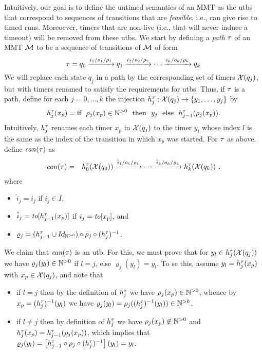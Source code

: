 Intuitively, our goal is to define the untimed semantics of an MMT as the utbs
that correspond to sequences of transitions that are {\em feasible}, i.e.,
can give rise to timed runs. Moreoever, timers that are non-live (i.e., that will
never induce a timeout) will be removed from these utbs.
We start by 
defining a \emph{path} $\tau$ of an MMT ${\mathcal M}$ to be a sequence of
transitions of ${\mathcal M}$ of form
\[
\tau = q_0 \xrightarrow{i_1/o_1/\rho_1} q_1  \xrightarrow{i_2/o_2/\rho_2}
\cdots
\xrightarrow{i_k/o_k/\rho_k} q_k
\]
We will replace each state $q_j$ in a path by the corresponding set of timers
$\mathcal{X}(q_j)$, but with timers renamed to satisfy the requirements for utbs.
Thus, if $\tau$ is a path,  define for each $j = 0, \ldots , k$ the injection
$h_{j}^{\tau}: \mathcal{X}(q_j) \rightarrow \lbrace y_1, \ldots ,y_j\rbrace$
by
\[
h_{j}^{\tau}(x_p) = \mbox{if} \ \ \rho_j(x_p) \in {\mathbb N}^{>0}
\ \ \mbox{then} \ \ y_j
\ \ \mbox{else} \ \
h_{j-1}^{\tau}(\rho_j(x_p)).
\]
Intuitively, $h_{j}^{\tau}$ renames each timer $x_p$
in $\mathcal{X}(q_j)$ to the timer $y_l$ whose index $l$ is the same as
the index of the transition in which $x_p$ was started.
For $\tau$ as above, define $\mathit{can}({\tau})$ as
\begin{eqnarray*}
  \mathit{can}({\tau}) & = & h_{0}^{\tau}(\mathcal{X}(q_0)) \xrightarrow{\hat{i}_1/o_1/\varrho_1}
\cdots \xrightarrow{\hat{i}_k/o_k/\varrho_k} h_{k}^{\tau}(\mathcal{X}(q_k))
\ ,
\end{eqnarray*}
where
\begin{itemize}
\item
  $\hat{i}_j   =  i_j$ if $i_j \in I$,
\item
  $\hat{i}_j   = \mathit{to}[h_{j-1}^{\tau}(x_p)]$ if $i_j   = \mathit{to}[x_p]$, and
\item
  $\varrho_j = (h_{j-1}^{\tau} \cup \mbox{\sl Id}_{{\mathbb N}^{>0}}) \circ \rho_j \circ (h_{j}^{\tau})^{-1}$. 
\end{itemize}
We claim that $\mathit{can}({\tau})$ is an utb. For this, we must prove that
for $y_l \in h_{j}^{\tau}(\mathcal{X}(q_j))$ we have $\varrho_j(y_l) \in {\mathbb N}^{>0}$ if $l=j$, else $\varrho_j(y_l) = y_l$.
To se this, assume $y_l = h_{j}^{\tau}(x_p)$ with $x_p \in \mathcal{X}(q_j)$,
and note that
\begin{itemize}
\item if $l=j$ then by the definition of $h_{j}^{\tau}$ we have
  $\rho_j(x_p) \in {\mathbb N}^{>0}$, whence by $x_p = (h_{j}^{\tau})^{-1}(y_l)$
 we have $\varrho_j(y_l) = \rho_j((h_{j}^{\tau})^{-1}(y_l)) \in {\mathbb N}^{>0}$,
\item
  if $l \neq j$ then by definition of $h_{j}^{\tau}$ we have
$\rho_j(x_p) \not\in {\mathbb N}^{>0}$ and
  $h_{j}^{\tau}(x_p) = h_{j-1}^{\tau}(\rho_j(x_p))$, which
  implies that
  \\
  $\varrho_j(y_l) =
  \left[h_{j-1}^{\tau} \circ \rho_j \circ (h_{j}^{\tau})^{-1}\right](y_l) = y_l$.
\end{itemize}
